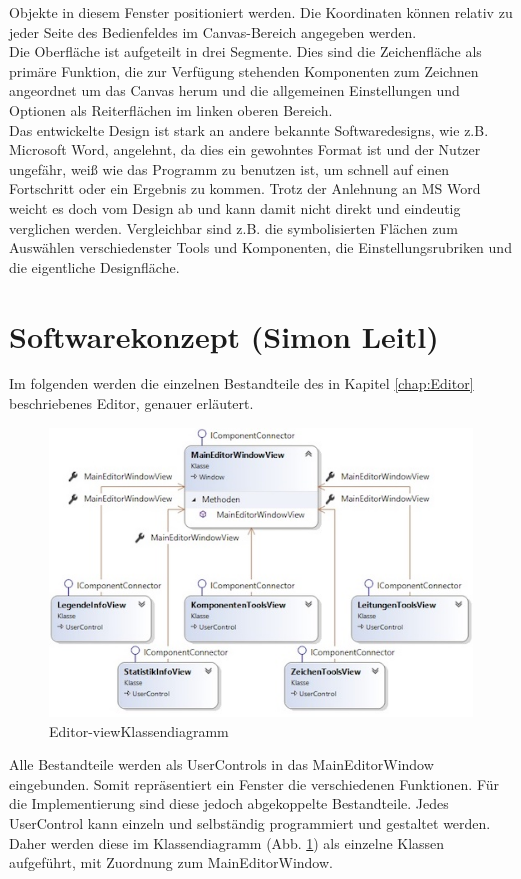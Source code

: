 Objekte in diesem Fenster positioniert werden. Die Koordinaten können relativ zu jeder Seite des Bedienfeldes im Canvas-Bereich angegeben 
werden.
\\
\linebreak
Die Oberfläche ist aufgeteilt in drei Segmente. Dies sind die Zeichenfläche als primäre Funktion, die zur Verfügung stehenden 
Komponenten zum Zeichnen angeordnet um das Canvas herum und die allgemeinen Einstellungen und Optionen als Reiterflächen im linken 
oberen Bereich. 
\\
\linebreak
Das entwickelte Design ist stark an andere bekannte Softwaredesigns, wie z.B. Microsoft Word, angelehnt, da dies ein gewohntes
Format ist und der Nutzer ungefähr, weiß wie das Programm zu benutzen ist, um schnell auf einen Fortschritt oder ein Ergebnis zu kommen. 
Trotz der Anlehnung an MS Word weicht es doch vom Design ab und kann damit nicht direkt und eindeutig verglichen werden. 
Vergleichbar sind z.B. die symbolisierten Flächen zum Auswählen verschiedenster Tools und Komponenten, die Einstellungsrubriken und 
die eigentliche Designfläche.
\section{Softwarekonzept (Simon Leitl)}
\label{chap:Softwarekonzept}
Im folgenden werden die einzelnen Bestandteile des in Kapitel \ref{chap:Editor} beschriebenes Editor, genauer erläutert. 
\begin{figure}[hbt!]
    \centering
    \includegraphics{4Systementwurf/Bilder/EditorView}
    \caption{Editor-viewKlassendiagramm}
    \label{pic:viewKlassendiagramm}
\end{figure}
\linebreak
Alle Bestandteile werden als UserControls in das MainEditorWindow eingebunden. Somit repräsentiert ein Fenster die verschiedenen Funktionen. Für die Implementierung sind diese jedoch abgekoppelte Bestandteile. Jedes UserControl kann einzeln und selbständig programmiert und gestaltet werden. Daher werden diese im Klassendiagramm (Abb. \ref{pic:viewKlassendiagramm}) als einzelne Klassen aufgeführt, mit Zuordnung zum MainEditorWindow. 
